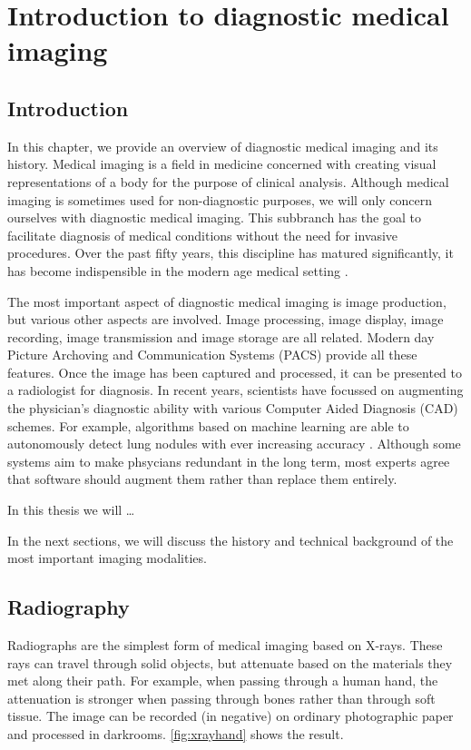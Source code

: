 \chapter{Introduction to diagnostic medical imaging}

\section{Introduction}
In this chapter, we provide an overview of diagnostic medical imaging and its
history. Medical imaging is a field in medicine concerned with creating visual
representations of a body for the purpose of clinical analysis. Although medical
imaging is sometimes used for non-diagnostic purposes, we will only concern
ourselves with diagnostic medical imaging. This subbranch has the goal to
facilitate diagnosis of medical conditions without the need for invasive
procedures. Over the past fifty years, this discipline has matured
significantly, it has become indispensible in the modern age medical setting
\cite{review}.

The most important aspect of diagnostic medical imaging is image production, but
various other aspects are involved. Image processing, image display, image
recording, image transmission and image storage are all related. Modern day
Picture Archoving and Communication Systems (PACS) provide all these features.
Once the image has been captured and processed, it can be presented to a
radiologist for diagnosis. In recent years, scientists have focussed on
augmenting the physician's diagnostic ability with various Computer Aided
Diagnosis (CAD) schemes. For example, algorithms based on machine learning are
able to autonomously detect lung nodules with ever increasing accuracy
\cite{ginneken}. Although some systems aim to make phsycians redundant in the
long term, most experts agree that software should augment them rather than
replace them entirely.

In this thesis we will \ldots %

In the next sections, we will discuss the history and technical background of
the most important imaging modalities.

\section{Radiography}
Radiographs are the simplest form of medical imaging based on X-rays. These rays
can travel through solid objects, but attenuate based on the materials they met
along their path. For example, when passing through a human hand, the
attenuation is stronger when passing through bones rather than through soft
tissue. The image can be recorded (in negative) on ordinary photographic paper
and processed in darkrooms. \autoref{fig:xrayhand} shows the result.

